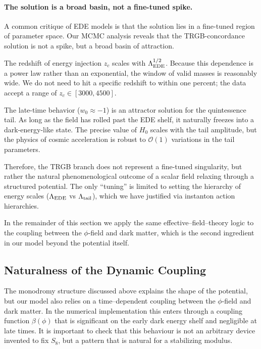 \documentclass[a4paper,11pt]{article}
\begin{document}
\paragraph{The solution is a broad basin, not a fine-tuned spike.}
A common critique of EDE models is that the solution lies in a fine-tuned region of parameter space. Our MCMC analysis reveals that the TRGB-concordance solution is not a spike, but a broad basin of attraction.

The redshift of energy injection $z_c$ scales with $\Lambda_{\rm EDE}^{1/2}$. Because this dependence is a power law rather than an exponential, the window of valid masses is reasonably wide. We do not need to hit a specific redshift to within one percent; the data accept a range of $z_c \in [3000, 4500]$.

The late-time behavior ($w_0 \approx -1$) is an attractor solution for the quintessence tail. As long as the field has rolled past the EDE shelf, it naturally freezes into a dark-energy-like state. The precise value of $H_0$ scales with the tail amplitude, but the physics of cosmic acceleration is robust to $\mathcal{O}(1)$ variations in the tail parameters.

Therefore, the TRGB branch does not represent a fine-tuned singularity, but rather the natural phenomenological outcome of a scalar field relaxing through a structured potential. The only ``tuning'' is limited to setting the hierarchy of energy scales ($\Lambda_{\rm EDE}$ vs $\Lambda_{\rm tail}$), which we have justified via instanton action hierarchies.

In the remainder of this section we apply the same effective--field--theory logic to the coupling between the $\phi$-field and dark matter, which is the second ingredient in our model beyond the potential itself.


\subsection{Naturalness of the Dynamic Coupling}
\label{sec:coupling_naturalness}

The monodromy structure discussed above explains the shape of the potential, but our model also relies on a time--dependent coupling between the $\phi$-field and dark matter. In the numerical implementation this enters through a coupling function $\beta(\phi)$ that is significant on the early dark energy shelf and negligible at late times. It is important to check that this behaviour is not an arbitrary device invented to fix $S_8$, but a pattern that is natural for a stabilizing modulus.
\end{document}
